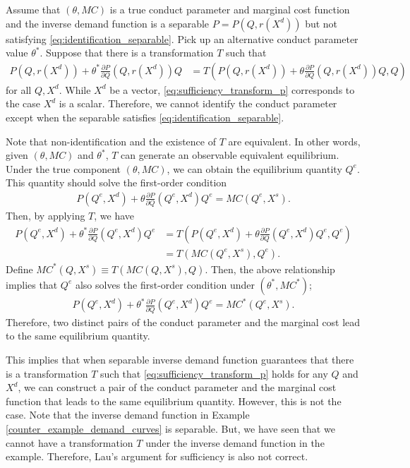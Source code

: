 \documentclass[11pt, a4paper]{article}
\theoremstyle{remark}
\begin{document}
Assume that $(\theta, MC)$ is a true conduct parameter and marginal cost function and the inverse demand function is a separable $P = P(Q, r(X^{d}))$ but not satisfying  \eqref{eq:identification_separable}.
Pick up an alternative conduct parameter value $\theta^{*}$.
Suppose that there is a transformation $T$ such that
\begin{align}
    P(Q, r(X^d)) + \theta^{*}\frac{\partial P}{\partial Q}(Q, r(X^d)) Q 
    &= T\left(P(Q, r(X^d)) + \theta \frac{\partial P}{\partial Q}(Q, r(X^d)) Q, Q\right) \label{eq:sufficiency_transform_p}
\end{align}
for all $Q, X^d$.
While $X^{d}$ be a vector, \eqref{eq:sufficiency_transform_p} corresponds to the case $X^{d}$ is a scalar.
Therefore, we cannot identify the conduct parameter except when the separable satisfies \eqref{eq:identification_separable}.


Note that non-identification and the existence of $T$ are equivalent.
In other words, given $(\theta, MC)$ and $\theta^{*}$, $T$ can generate an observable equivalent equilibrium.
Under the true component $(\theta, MC)$, we can obtain the equilibrium quantity $Q^{e}$.
This quantity should solve the first-order condition 
\begin{align}
    P(Q^e, X^d) + \theta \frac{\partial P}{\partial Q}(Q^e, X^d) Q^e = MC(Q^e, X^{s}).
\end{align}
Then, by applying $T$, we have
\begin{align}
    P(Q^e, X^d) + \theta^{*} \frac{\partial P}{\partial Q}(Q^e, X^d) Q^e 
    & = T\left(P(Q^e, X^d) + \theta \frac{\partial P}{\partial Q}(Q^e, X^d) Q^e, Q^e\right) \\
    &= T( MC(Q^e, X^{s}), Q^e).
\end{align}
Define $MC^{*}(Q, X^{s}) \equiv T(MC(Q, X^{s}), Q)$.
Then, the above relationship implies that $Q^{e}$ also solves the first-order condition under $(\theta^{*}, MC^{*})$;
\begin{align}
    P(Q^e, X^d) + \theta^{*} \frac{\partial P}{\partial Q}(Q^e, X^d) Q^e = MC^{*}(Q^e, X^{s}).
\end{align}
Therefore, two distinct pairs of the conduct parameter and the marginal cost lead to the same equilibrium quantity.


This implies that when separable inverse demand function guarantees that there is a transformation $T$ such that \eqref{eq:sufficiency_transform_p} holds for any $Q$ and $X^{d}$, we can construct a pair of the conduct parameter and the marginal cost function that leads to the same equilibrium quantity.
However, this is not the case.
Note that the inverse demand function in Example \ref{counter_example_demand_curves} is separable.
But, we have seen that we cannot have a transformation $T$ under the inverse demand function in the example.
Therefore, Lau's argument for sufficiency is also not correct.
\end{document}
